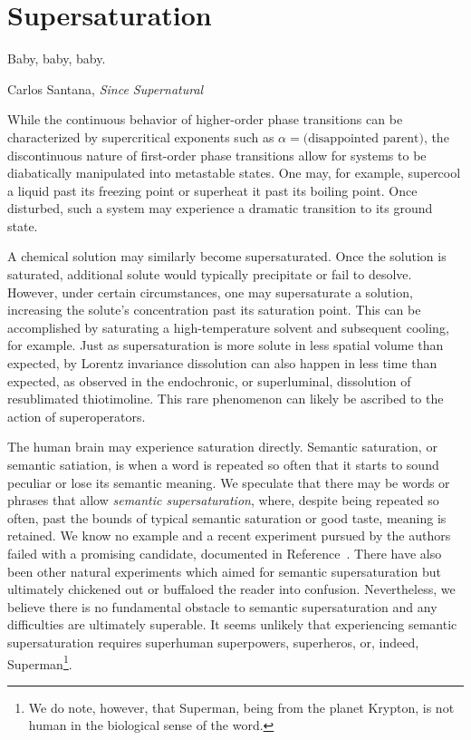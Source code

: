 \section{Supersaturation}

\epigraph{Baby, baby, baby.
}{Carlos Santana, \textit{Since Supernatural}}

While the continuous behavior of higher-order phase transitions can be characterized by supercritical exponents such as $\alpha=\text{(disappointed parent)}$, the discontinuous nature of first-order phase transitions allow for systems to be diabatically manipulated into metastable states.
One may, for example, supercool a liquid past its freezing point or superheat it past its boiling point.
Once disturbed, such a system may experience a dramatic transition to its ground state.


A chemical solution may similarly become supersaturated.
Once the solution is saturated, additional solute would typically precipitate or fail to desolve.
However, under certain circumstances, one may supersaturate a solution, increasing the solute's concentration past its saturation point.
This can be accomplished by saturating a high-temperature solvent and subsequent cooling, for example.
Just as supersaturation is more solute in less spatial volume than expected, by Lorentz invariance dissolution can also happen in less time than expected, as observed in the endochronic, or superluminal, dissolution of resublimated thiotimoline\cite{asimov:1948,asimov:1953,asimov:1960,vernon:2022}.
This rare phenomenon can likely be ascribed to the action of superoperators\cite{Deutsch:1991nm}.

The human brain may experience saturation directly.
Semantic saturation, or semantic satiation, is when a word is repeated so often that it starts to sound peculiar or lose its semantic meaning.
We speculate that there may be words or phrases that allow \emph{semantic supersaturation}, where, despite being repeated so often, past the bounds of typical semantic saturation or good taste, meaning is retained.
We know no example and a recent experiment pursued by the authors failed with a promising candidate, documented in Reference~\cite{self}.
There have also been other natural experiments which aimed for semantic supersaturation but ultimately chickened out\cite{chicken} or buffaloed the reader into confusion\cite{buffalo}.
Nevertheless, we believe there is no fundamental obstacle to semantic supersaturation and any difficulties are ultimately superable.
It seems unlikely that experiencing semantic supersaturation requires superhuman superpowers, superheros, or, indeed, Superman\footnote{We do note, however, that Superman, being from the planet Krypton, is not human in the biological sense of the word.}\cite{tippett:2009}.
